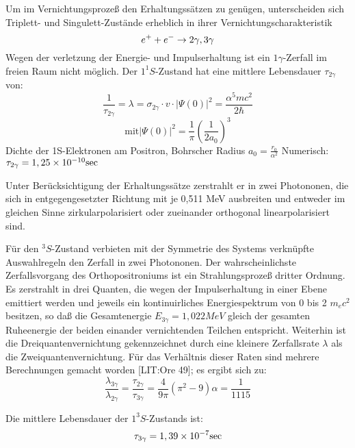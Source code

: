 Um im Vernichtungsprozeß den Erhaltungssätzen zu genügen, unterscheiden sich Triplett- und Singulett-Zustände erheblich in ihrer Vernichtungscharakteristik
\begin{equation*}
 e^+ + e^- \rightarrow 2\gamma , 3\gamma
\end{equation*}
Wegen der verletzung der Energie- und Impulserhaltung ist ein $1\gamma$-Zerfall im freien Raum nicht möglich.
Der $1^1S$-Zustand hat eine mittlere Lebensdauer $\tau_{2\gamma}$ von:
\begin{equation*}
 \frac{1}{\tau_{2\gamma}} = \lambda = \sigma_{2\gamma} \cdot v \cdot \left| \Psi(0) \right|^2 = \frac{\alpha^5 m c^2}{2 \hbar}
\end{equation*}
\begin{equation*}
 \text{mit} \left| \Psi(0) \right|^2 = \frac{1}{\pi} \left( \frac{1}{2a_0} \right)^3
\end{equation*}
Dichte der 1S-Elektronen am Positron, Bohrscher Radius $a_0 = \frac{r_0}{\alpha^2}$
Numerisch: $\tau_{2\gamma} = 1,25\times 10^{-10}\text{sec}$

Unter Berücksichtigung der Erhaltungssätze zerstrahlt er in zwei Photononen, die sich in entgegengesetzter Richtung mit je 0,511 MeV ausbreiten und entweder im gleichen Sinne zirkularpolarisiert oder zueinander orthogonal linearpolarisiert sind.

Für den ${}^3S$-Zustand verbieten mit der Symmetrie des Systems verknüpfte Auswahlregeln den Zerfall in zwei Photononen. Der wahrscheinlichste Zerfallsvorgang des Orthopositroniums ist ein Strahlungsprozeß dritter Ordnung. Es zerstrahlt in drei Quanten, die wegen der Impulserhaltung in einer Ebene emittiert werden und jeweils ein kontinuirliches Energiespektrum von 0 bis 2 $m_ec^2$ besitzen, so daß die Gesamtenergie $E_{3\gamma} = 1,022 MeV$ gleich der gesamten Ruheenergie der beiden einander vernichtenden Teilchen entspricht. Weiterhin ist die Dreiquantenvernichtung gekennzeichnet durch eine kleinere Zerfallsrate $\lambda$ als die Zweiquantenvernichtung. Für das Verhältnis dieser Raten sind mehrere Berechnungen gemacht worden [LIT:Ore 49]; es ergibt sich zu:
\begin{equation*}
 \frac{\lambda_{3\gamma}}{\lambda_{2\gamma}} = \frac{\tau_{2\gamma}}{\tau_{3\gamma}} = \frac{4}{9\pi} \left(\pi^2 - 9 \right) \alpha = \frac{1}{1115}
\end{equation*}

Die mittlere Lebensdauer der $1^3S$-Zustands ist:
\begin{equation*}
 \tau_{3\gamma} = 1,39\times 10^{-7} \text{sec}
\end{equation*}

